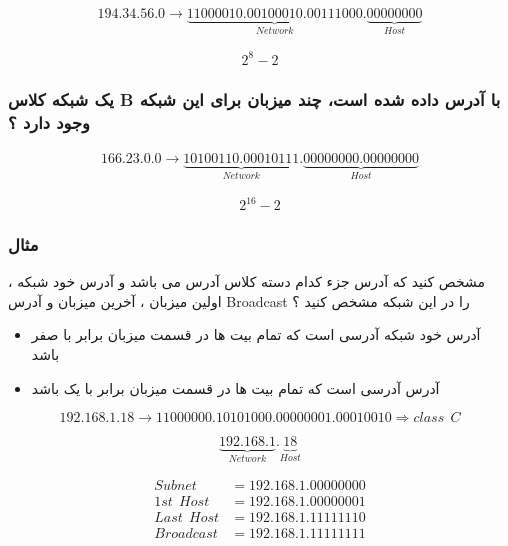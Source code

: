 \documentclass[12pt]{book}
\begin{document}
\begin{tcolorbox}
\begin{align*}
194.34.56.0 \to \underbrace{11000010.00100010.00111000}_{Network}.\underbrace{00000000}_{Host}
\end{align*}

{
\LARGE
$$
2^{8} - 2
$$
}
\end{tcolorbox}



\subsubsection{
 یک شبکه کلاس B با آدرس 
داده شده است، چند میزبان برای  این شبکه وجود دارد ؟ 
}

\begin{tcolorbox}
\begin{align*}
166.23.0.0 \to \underbrace{10100110.00010111}_{Network}.\underbrace{00000000.00000000}_{Host}
\end{align*}

{
\LARGE
$$
2^{16} - 2
$$
}
\end{tcolorbox}


\newpage

\subsubsection{مثال}


 مشخص کنید که آدرس 
جزء کدام دسته کلاس آدرس می باشد و آدرس خود شبکه ، اولین میزبان ، آخرین میزبان و آدرس Broadcast را در این شبکه مشخص کنید ؟


\begin{itemize}
	\item آدرس خود شبکه آدرسی است که تمام بیت ها در قسمت میزبان برابر با صفر باشد
	\item آدرس 
آدرسی است که تمام بیت ها در قسمت میزبان برابر با یک باشد
\end{itemize}



\begin{tcolorbox}
$$
192.168.1.18 \to 11000000.10101000.00000001.00010010 \Rightarrow class \:\: C
$$

$$
\underbrace{192.168.1}_{Network}.\underbrace{18}_{Host}
$$


\begin{align*}
Subnet &= 192.168.1.00000000 \\
1st \:\: Host &= 192.168.1.00000001 \\
Last \:\: Host &= 192.168.1.11111110 \\
Broadcast &= 192.168.1.11111111 \\
\end{align*}

\end{tcolorbox}
\end{document}
